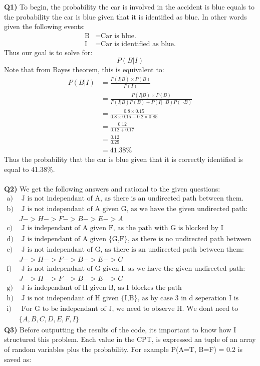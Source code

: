 \documentclass{article}
\begin{document}
\begin{titlepage}
\vspace{0.5cm}
\textbf{Q1)} To begin, the probability the car is involved in the accident is blue equals to the probability the car is blue given that it is identified as blue. In other words given the following events:
\begin{align*}
\text{B} &= \text{Car is blue.} \\
\text{I} &= \text{Car is identified as blue.}
\end{align*}
Thus our goal is to solve for:
\[ P(B|I) \]
Note that from Bayes theorem, this is equivalent to:
\begin{align*}
P(B|I) &= \frac{P(I|B)\times P(B)}{P(I)} \\
&= \frac{P(I|B)\times P(B)}{P(I|B)P(B) + P(I|\neg B)P(\neg B)} \\
&= \frac{0.8 \times 0.15}{0.8 \times 0.15 + 0.2 \times 0.85} \\
&= \frac{0.12}{0.12 + 0.17} \\
&= \frac{0.12}{0.29} \\
&= 41.38\%
\end{align*}
Thus the probability that the car is blue given that it is correctly identified is equal to 41.38$\%$.\\\\
\textbf{Q2)} We get the following answers and rational to the given questions:
\begin{align*}
\text{a)} & \text{ J is not independant of A, as there is an undirected path between them.} \\
\text{b)} & \text{ J is not independant of A given G, as we have the given undirected path:} \\
& J -> H -> F -> B -> E -> A\\
\text{c)} & \text{ J is independant of A given F, as the path with G is blocked by I} \\
\text{d)} & \text{ J is independant of A given \{G,F\}, as there is no undirected path between them.} \\
\text{e)} & \text{ J is not independant of G, as there is an undirected path between them:} \\
& J -> H -> F -> B -> E -> G\\
\text{f)} & \text{ J is not independant of G given I, as we have the given undirected path:} \\
& J -> H -> F -> B -> E -> G \\
\text{g)} & \text{ J is independant of H given B, as I blockes the path} \\
\text{h)} & \text{ J is not independant of H given \{I,B\}, as by case 3 in d seperation I is blocking.} \\
\text{i)} & \text{ For G to be independant of J, we need to observe H. We dont need to oberserve any of the following:} \\
& \{A,B,C,D,E,F,I\}
\end{align*}
\newpage
\textbf{Q3)} Before outputting the results of the code, its important to know how I structured this problem. Each value in the CPT, is expressed an tuple of an array of random variables plus the probability. For example P(A=T, B=F) = 0.2 is saved as:


\end{titlepage}
\end{document}
